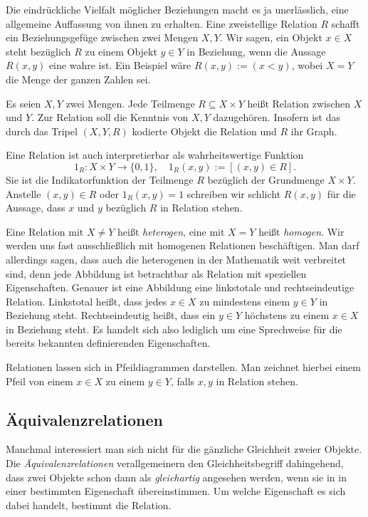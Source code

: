 Die eindrückliche Vielfalt möglicher Beziehungen macht es ja
unerlässlich, eine allgemeine Auffassung von ihnen zu erhalten.
Eine zweistellige Relation $R$ schafft ein Beziehungsgefüge zwischen
zwei Mengen $X,Y$. Wir sagen, ein Objekt $x\in X$ steht bezüglich
$R$ zu einem Objekt $y\in Y$ in Beziehung, wenn die Aussage $R(x,y)$
eine wahre ist. Ein Beispiel wäre $R(x,y):=(x<y)$, wobei $X=Y$ die Menge
der ganzen Zahlen sei.

\begin{Definition}\newlinefirst
Es seien $X,Y$ zwei Mengen. Jede Teilmenge $R\subseteq X\times Y$ heißt
Relation zwischen $X$ und $Y$. Zur Relation soll die Kenntnis von
$X,Y$ dazugehören. Insofern ist das durch das Tripel $(X,Y,R)$ kodierte
Objekt die Relation und $R$ ihr Graph.
\end{Definition}

\noindent
Eine Relation ist auch interpretierbar als wahrheitswertige Funktion
\[1_R\colon X\times Y\to\{0,1\},\quad 1_R(x,y):=[(x,y)\in R].\]
Sie ist die Indikatorfunktion der Teilmenge $R$ bezüglich der
Grundmenge $X\times Y$. Anstelle $(x,y)\in R$ oder $1_R(x,y)=1$
schreiben wir schlicht $R(x,y)$ für die Aussage, dass $x$ und $y$
bezüglich $R$ in Relation stehen.

Eine Relation mit $X\ne Y$ heißt \emph{heterogen}, eine mit
$X=Y$ heißt \emph{homogen}. Wir werden uns fast ausschließlich mit
homogenen Relationen beschäftigen. Man darf allerdings sagen, dass
auch die heterogenen in der Mathematik weit verbreitet sind, denn
jede Abbildung ist betrachtbar als Relation mit speziellen
Eigenschaften. Genauer ist eine Abbildung eine linkstotale und
rechtseindeutige Relation. Linkstotal heißt, dass jedes $x\in X$
zu mindestens einem $y\in Y$ in Beziehung steht. Rechtseindeutig heißt,
dass ein $y\in Y$ höchstens zu einem $x\in X$ in Beziehung steht. Es
handelt sich also lediglich um eine Sprechweise für die bereits
bekannten definierenden Eigenschaften.

Relationen lassen sich in Pfeildiagrammen darstellen. Man zeichnet
hierbei einem Pfeil von einem $x\in X$ zu einem $y\in Y$, falls $x,y$
in Relation stehen.

\subsection{Äquivalenzrelationen}

Manchmal interessiert man sich nicht für die gänzliche Gleichheit
zweier Objekte. Die \emph{Äquivalenzrelationen}%
 verallgemeinern den
Gleichheitsbegriff dahingehend, dass zwei Objekte schon dann als
\emph{gleichartig} angesehen werden, wenn sie in
in einer bestimmten Eigenschaft übereinstimmen. Um welche Eigenschaft
es sich dabei handelt, bestimmt die Relation.

